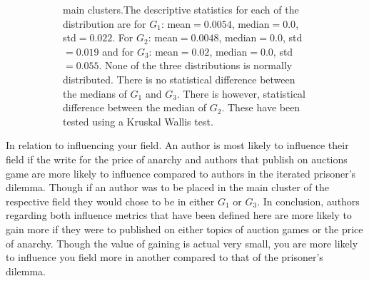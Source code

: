 \documentclass{article}
\theoremstyle{definition}
\begin{document}
\begin{figure}[!hbtp]
\begin{subfigure}{\textwidth}
{        main clusters.The descriptive
        statistics for each of the distribution are for \(G_1\): mean\(=0.0054\),
        median\(=0.0\), std\(=0.022\). For \(G_2\): mean\(=0.0048\), median\(=0.0\),
        std\(=0.019\) and for \(G_3\): mean\(=0.02\), median\(=0.0\), std\(=0.055\).
        None of the three distributions is normally distributed. There is no
        statistical difference between the medians of \(G_1\) and \(G_3\). There
        is however, statistical difference between the median of \(G_2\).
        These have been tested using a Kruskal Wallis test.}\label{fig:betweenness_dist_cluster}
    \end{subfigure}%
\end{figure}

In relation to influencing your field. An author is most likely to influence their
field if the write for the price of anarchy and authors that publish on auctions
game are more likely to influence compared to authors in the iterated prisoner's
dilemma. Though if an author was to be placed in the main cluster of the respective
field they would chose to be in either \(G_1\) or \(G_3\).
In conclusion, authors regarding both influence metrics that have been defined here
are more likely to gain more if they were to published on either topics of auction
games or the price of anarchy. Though the value of gaining is actual very small,
you are more likely to influence you field more in another compared to that
of the prisoner's dilemma.
\end{document}
